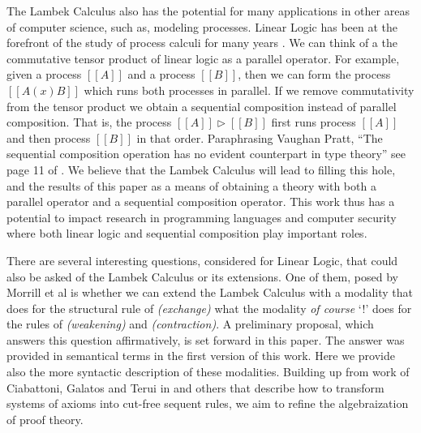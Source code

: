 \documentclass{entcs}
\begin{document}
The Lambek Calculus also has the potential for many applications in
other areas of computer science, such as, modeling processes.  Linear
Logic has been at the forefront of the study of process calculi for
many years \cite{HONDA20102223,Pratt:1997,ABRAMSKY19945}. We can think
of a the commutative tensor product of linear logic as a parallel
operator.  For example, given a process $[[A]]$ and a process $[[B]]$,
then we can form the process $[[A (x) B]]$ which runs both processes
in parallel.  If we remove commutativity from the tensor product we
obtain a sequential composition instead of parallel composition.  That
is, the process $[[A]] \rhd [[B]]$ first runs process $[[A]]$ and then
process $[[B]]$ in that order.  Paraphrasing Vaughan Pratt, ``The
sequential composition operation has no evident counterpart in type
theory'' see page 11 of \cite{Pratt:1997}.  We believe that the Lambek
Calculus will lead to filling this hole, and the results of this paper
as a means of obtaining a theory with both a parallel operator and a
sequential composition operator.  This work thus has a potential to
impact research in programming languages and computer security where
both linear logic and sequential composition play important roles.

There are several interesting questions, considered for Linear Logic,
that could also be asked of the Lambek Calculus or its extensions.
One of them, posed by Morrill et al is whether we can extend the
Lambek Calculus with a modality that does for the structural rule of
\textit{(exchange)} what the modality \textit{of course} `!' does for
the rules of \textit{(weakening)} and \textit{(contraction)}.  A
preliminary proposal, which answers this question affirmatively, is
set forward in this paper. The answer was provided in semantical terms
in the first version of this work. Here we provide also the more
syntactic description of these modalities. Building up from work of
Ciabattoni, Galatos and Terui in \cite{Ciabattoni2012} and others that
describe how to transform systems of axioms into cut-free sequent
rules, we aim to refine the algebraization of proof theory.

\end{document}
